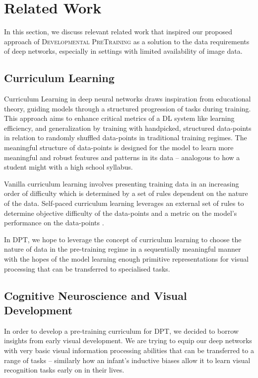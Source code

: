 \section{Related Work}
In this section, we discuss relevant related work that inspired our proposed approach of \textsc{Developmental PreTraining} as a solution to the data requirements of deep networks, especially in settings with limited availability of image data. 

\subsection{Curriculum Learning}
Curriculum Learning \cite{bengio2009curriculum} in deep neural networks draws inspiration from educational theory, guiding models through a structured progression of tasks during training. This approach aims to enhance critical metrics of a DL system like learning efficiency, and  generalization by training with handpicked, structured data-points in relation to randomly shuffled data-points in traditional training regimes. The meaningful structure of data-points is designed for the model to learn more meaningful and robust features and patterns in its data -- analogous to how a student might with a high school syllabus.

Vanilla curriculum learning \cite{bengio2009curriculum, spitkovsky2009baby} involves presenting training data in an increasing order of difficulty which is determined by a set of rules dependent on the nature of the data. Self-paced curriculum learning leverages an external set of rules to determine objective difficulty of the data-points and a metric on the model's performance on the data-points \cite{jiang2015self}.

In DPT, we hope to leverage the concept of curriculum learning to choose the nature of data in the pre-training regime in a sequentially meaningful manner with the hopes of the model learning enough primitive representations for visual processing that can be transferred to specialised tasks.

\subsection{Cognitive Neuroscience and Visual Development}\label{subsec_cogneuro_visual}
In order to develop a pre-training curriculum for \textsc{DPT}, we decided to borrow insights from early visual development. We are trying to equip our deep networks with very basic visual information processing abilities that can be transferred to a range of tasks -- similarly how an infant's inductive biases allow it to learn visual recognition tasks early on in their lives. 

